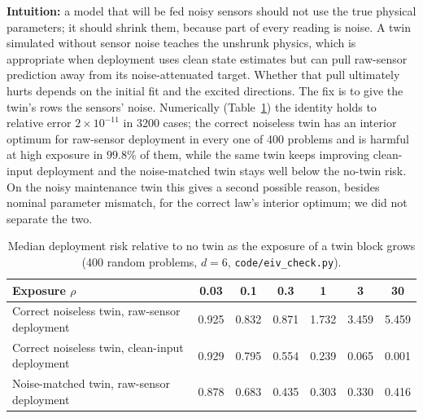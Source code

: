 \textbf{Intuition:} a model that will be fed noisy sensors should not use the true physical parameters; it should shrink them, because part of every reading is noise. A twin simulated without sensor noise teaches the unshrunk physics, which is appropriate when deployment uses clean state estimates but can pull raw-sensor prediction away from its noise-attenuated target. Whether that pull ultimately hurts depends on the initial fit and the excited directions. The fix is to give the twin's rows the sensors' noise. Numerically (Table~\ref{tab:eiv}) the identity holds to relative error $2\times10^{-11}$ in 3200 cases; the correct noiseless twin has an interior optimum for raw-sensor deployment in every one of 400 problems and is harmful at high exposure in $99.8\%$ of them, while the same twin keeps improving clean-input deployment and the noise-matched twin stays well below the no-twin risk. On the noisy maintenance twin this gives a second possible reason, besides nominal parameter mismatch, for the correct law's interior optimum; we did not separate the two.
\begin{table}[t]\centering\small
\caption{Median deployment risk relative to no twin as the exposure of a twin block grows (400 random problems, $d=6$, \texttt{code/eiv\_check.py}).}\label{tab:eiv}
\begin{tabular}{@{}lcccccc@{}}
\toprule
Exposure $\rho$ & 0.03 & 0.1 & 0.3 & 1 & 3 & 30\\
\midrule
Correct noiseless twin, raw-sensor deployment & 0.925 & 0.832 & 0.871 & 1.732 & 3.459 & 5.459\\
Correct noiseless twin, clean-input deployment & 0.929 & 0.795 & 0.554 & 0.239 & 0.065 & 0.001\\
Noise-matched twin, raw-sensor deployment & 0.878 & 0.683 & 0.435 & 0.303 & 0.330 & 0.416\\
\bottomrule
\end{tabular}
\end{table}

